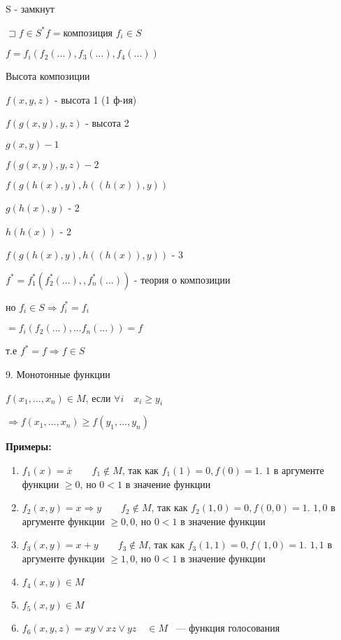 \documentclass[russian]{lecture-notes}
\begin{document}
	\begin{proposition}

		S - замкнут

		$\sqsupset f \in S^{*} f = $композиция $f_{i} \in S$

		$f = f_{i}(f_{2}(...),f_{3}(...),f_{4}(...))$

		\end{proposition}

	\begin{definition}

		Высота композиции

		$f(x,y,z)$ - высота 1 (1 ф-ия)

		$f(g(x,y),y,z)$ - высота 2

		$g(x,y) - 1$

		$f(g(x,y),y,z) - 2$
		\end{definition}


	\begin{example}
	$f(g(h(x),y),h((h(x)),y))$

	$g(h(x),y)$ - 2

	$h(h(x))$ - 2

	$f(g(h(x),y),h((h(x)),y))$ - 3

	\end{example}

	$f^{*} = f_{1}^{*}(f_{2}^{*}(...),  ,f_{n}^{*}(...))$ - теория о композиции

	но $f_{i} \in S \Rightarrow f_{i}^{*} = f_{i}$

	$= f_{i}(f_{2}(...),...f_{n}(...)) = f$

	т.е $f^{*} = f \Rightarrow f \in S$
	
	9. Монотонные функции
	
	$f(x_1, \dots, x_n) \in M$, если $\forall i \quad x_i \geq y_i$
	
	$\Rightarrow f(x_1, \dots, x_n) \geq f(y_1, \dots, y_n)$
	
	\textbf{Примеры:}
	\begin{enumerate}
		\item{
		$f_1(x) = \overline{x} \qquad f_1 \notin M$, так как $f_1(1) = 0, f(0) = 1$.
		$1$ в аргументе функции $\geq 0$, но $0 < 1$ в значение функции
		
		}
		\item{
		$f_2(x, y) = x \Rightarrow y \qquad f_2 \notin M$, так как $f_2(1,0) = 0, f(0,0) = 1$.
		$1,0$ в аргументе функции $\geq 0,0$, но $0 < 1$ в значение функции		
		}	
		\item{
		$f_3(x, y) = x + y \qquad f_3 \notin M$, так как $f_3(1,1) = 0, f(1,0) = 1$.
		$1,1$ в аргументе функции $\geq 1,0$, но $0 < 1$ в значение функции		
		}	
		\item $f_4(x, y) \in M$
		\item $f_5(x, y) \in M$
		\item $f_6(x, y, z) = xy \lor xz \lor yz \quad \in M$ ~--- функция голосования
	\end{enumerate}
\end{document}
